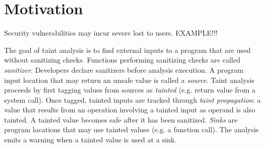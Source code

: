 \section{Motivation}

Security vulnerabilities may incur severe lost to users.
EXAMPLE!!!

The goal of taint analysis is to find external inputs
to a program that are used without sanitizing checks.
Functions performing sanitizing checks are called
\textit{sanitizer}. Developers declare sanitizers before
analysis execution.
A program input location that may return an unsafe
value is called a \textit{source}.
Taint analysis proceeds by first tagging values from sources
as \textit{tainted} (e.g. return value from a system call).
Once tagged, tainted inputs are tracked through
\textit{taint propagation}: a value that results from an
operation involving a tainted input as operand is also tainted.
A tainted value becomes safe after it has been sanitized.
\textit{Sinks} are program locations that may use tainted
values (e.g. a function call). The analysis emits a warning
when a tainted value is used at a sink.  
